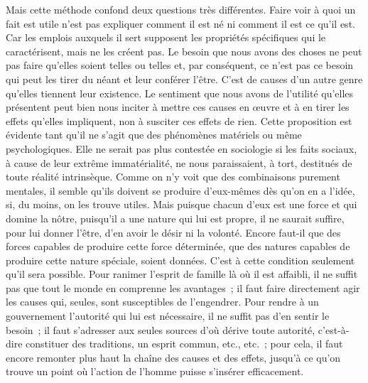 \documentclass[french,twoside]{book} %
\begin{document}
Mais cette méthode confond deux questions très différentes. Faire voir à quoi un fait est utile n’est pas expliquer comment il est né ni comment il est ce qu’il est. Car les emplois auxquels il sert supposent les propriétés spécifiques qui le caractérisent, mais ne les créent pas. Le besoin que nous avons des choses ne peut pas faire qu’elles soient telles ou telles et, par conséquent, ce n’est pas ce besoin qui peut les tirer du néant et leur conférer l’être. C’est de causes d’un autre genre qu’elles tiennent leur existence. Le sentiment que nous avons de l’utilité qu’elles présentent peut bien nous inciter à mettre ces causes en œuvre et à en tirer les effets qu’elles impliquent, non à susciter ces effets de rien. Cette proposition est évidente tant qu’il ne s’agit que des phénomènes matériels ou même psychologiques. Elle ne serait pas plus contestée en sociologie si les faits sociaux, à cause de leur extrême immatérialité, ne nous paraissaient, à tort, destitués de toute réalité intrinsèque. Comme on n’y voit que des combinaisons purement mentales, il semble qu’ils doivent se produire d’eux-mêmes dès qu’on en a l’idée, si, du moins, on les trouve utiles. Mais puisque chacun d’eux est une force et qui domine la nôtre, puisqu’il a une nature qui lui est propre, il ne saurait suffire, pour lui donner l’être, d’en avoir le désir ni la volonté. Encore faut-il que des forces capables de produire cette force déterminée, que des natures capables de produire cette nature spéciale, soient données. C’est à cette condition seulement qu’il sera possible. Pour ranimer l’esprit de famille là où il est affaibli, il ne suffit pas que tout le monde en comprenne les avantages ; il faut faire directement agir les causes qui, seules, sont susceptibles de l’engendrer. Pour rendre à un gouvernement l’autorité qui lui est nécessaire, il ne suffit pas d’en sentir le besoin ; il faut s’adresser aux seules sources d’où dérive toute autorité, c’est-à-dire constituer des traditions, un esprit commun, etc., etc. ; pour cela, il faut encore remonter plus haut la chaîne des causes et des effets, jusqu’à ce qu’on trouve un point où l’action de l’homme puisse s’insérer efficacement.\par
\end{document}
